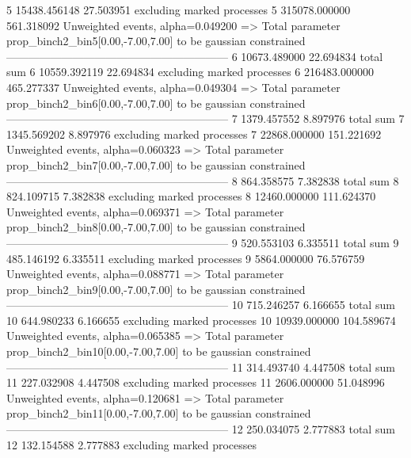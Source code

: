 5          15438.456148    27.503951       excluding marked processes    
5          315078.000000   561.318092      Unweighted events, alpha=0.049200
  => Total parameter prop_binch2_bin5[0.00,-7.00,7.00] to be gaussian constrained
------------------------------------------------------------
6          10673.489000    22.694834       total sum                     
6          10559.392119    22.694834       excluding marked processes    
6          216483.000000   465.277337      Unweighted events, alpha=0.049304
  => Total parameter prop_binch2_bin6[0.00,-7.00,7.00] to be gaussian constrained
------------------------------------------------------------
7          1379.457552     8.897976        total sum                     
7          1345.569202     8.897976        excluding marked processes    
7          22868.000000    151.221692      Unweighted events, alpha=0.060323
  => Total parameter prop_binch2_bin7[0.00,-7.00,7.00] to be gaussian constrained
------------------------------------------------------------
8          864.358575      7.382838        total sum                     
8          824.109715      7.382838        excluding marked processes    
8          12460.000000    111.624370      Unweighted events, alpha=0.069371
  => Total parameter prop_binch2_bin8[0.00,-7.00,7.00] to be gaussian constrained
------------------------------------------------------------
9          520.553103      6.335511        total sum                     
9          485.146192      6.335511        excluding marked processes    
9          5864.000000     76.576759       Unweighted events, alpha=0.088771
  => Total parameter prop_binch2_bin9[0.00,-7.00,7.00] to be gaussian constrained
------------------------------------------------------------
10         715.246257      6.166655        total sum                     
10         644.980233      6.166655        excluding marked processes    
10         10939.000000    104.589674      Unweighted events, alpha=0.065385
  => Total parameter prop_binch2_bin10[0.00,-7.00,7.00] to be gaussian constrained
------------------------------------------------------------
11         314.493740      4.447508        total sum                     
11         227.032908      4.447508        excluding marked processes    
11         2606.000000     51.048996       Unweighted events, alpha=0.120681
  => Total parameter prop_binch2_bin11[0.00,-7.00,7.00] to be gaussian constrained
------------------------------------------------------------
12         250.034075      2.777883        total sum                     
12         132.154588      2.777883        excluding marked processes    
